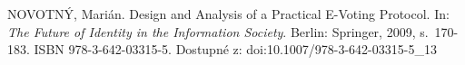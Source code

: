 \begin{thebibliography}{1}

NOVOTNÝ, Marián. Design and Analysis of a Practical E-Voting Protocol. In: \textit{The Future of Identity in the Information Society}. Berlin: Springer, 2009, s.~170-183. ISBN 978-3-642-03315-5. Dostupné z: doi:10.1007/978-3-642-03315-5\_13

\end{thebibliography}